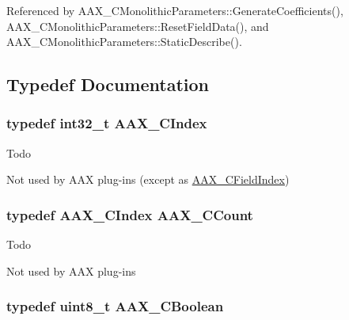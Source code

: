 Referenced by A\+A\+X\+\_\+\+C\+Monolithic\+Parameters\+::\+Generate\+Coefficients(), A\+A\+X\+\_\+\+C\+Monolithic\+Parameters\+::\+Reset\+Field\+Data(), and A\+A\+X\+\_\+\+C\+Monolithic\+Parameters\+::\+Static\+Describe().



\subsection{Typedef Documentation}
\hypertarget{a00149_a24ac375fa55ccadbc3126e6d81146c28}{}
\subsubsection[{A\+A\+X\+\_\+\+C\+Index}]{\setlength{\rightskip}{0pt plus 5cm}typedef int32\+\_\+t {\bf A\+A\+X\+\_\+\+C\+Index}}\label{a00149_a24ac375fa55ccadbc3126e6d81146c28}
\begin{DoxyRefDesc}{Todo}
\item[\hyperlink{a00382__todo000003}{Todo}]Not used by A\+A\+X plug-\/ins (except as \hyperlink{a00149_ae807f8986143820cfb5d6da32165c9c7}{A\+A\+X\+\_\+\+C\+Field\+Index}) \end{DoxyRefDesc}
\hypertarget{a00149_a9a9a14ab1486fa8c6734b96976be3056}{}
\subsubsection[{A\+A\+X\+\_\+\+C\+Count}]{\setlength{\rightskip}{0pt plus 5cm}typedef {\bf A\+A\+X\+\_\+\+C\+Index} {\bf A\+A\+X\+\_\+\+C\+Count}}\label{a00149_a9a9a14ab1486fa8c6734b96976be3056}
\begin{DoxyRefDesc}{Todo}
\item[\hyperlink{a00382__todo000004}{Todo}]Not used by A\+A\+X plug-\/ins \end{DoxyRefDesc}
\hypertarget{a00149_aa216506530f1d19a2965931ced2b274b}{}
\subsubsection[{A\+A\+X\+\_\+\+C\+Boolean}]{\setlength{\rightskip}{0pt plus 5cm}typedef uint8\+\_\+t {\bf A\+A\+X\+\_\+\+C\+Boolean}}\label{a00149_aa216506530f1d19a2965931ced2b274b}


